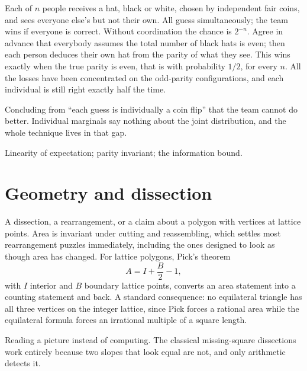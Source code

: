 \begin{worked}
Each of $n$ people receives a hat, black or white, chosen by independent fair coins, and sees everyone else's but not their own. All guess simultaneously; the team wins if everyone is correct. Without coordination the chance is $2^{-n}$. Agree in advance that everybody assumes the total number of black hats is even; then each person deduces their own hat from the parity of what they see. This wins exactly when the true parity is even, that is with probability $1/2$, for every $n$. All the losses have been concentrated on the odd-parity configurations, and each individual is still right exactly half the time.
\end{worked}

\begin{trap}
Concluding from ``each guess is individually a coin flip'' that the team cannot do better. Individual marginals say nothing about the joint distribution, and the whole technique lives in that gap.
\end{trap}

\begin{seealsob}Linearity of expectation; parity invariant; the information bound.\end{seealsob}

\section{Geometry and dissection}

\cue A dissection, a rearrangement, or a claim about a polygon with vertices at lattice points.
\method Area is invariant under cutting and reassembling, which settles most rearrangement puzzles immediately, including the ones designed to look as though area has changed. For lattice polygons, Pick's theorem
\[
A=I+\frac{B}{2}-1,
\]
with $I$ interior and $B$ boundary lattice points, converts an area statement into a counting statement and back. A standard consequence: no equilateral triangle has all three vertices on the integer lattice, since Pick forces a rational area while the equilateral formula forces an irrational multiple of a square length.

\begin{trap}
Reading a picture instead of computing. The classical missing-square dissections work entirely because two slopes that look equal are not, and only arithmetic detects it.
\end{trap}

